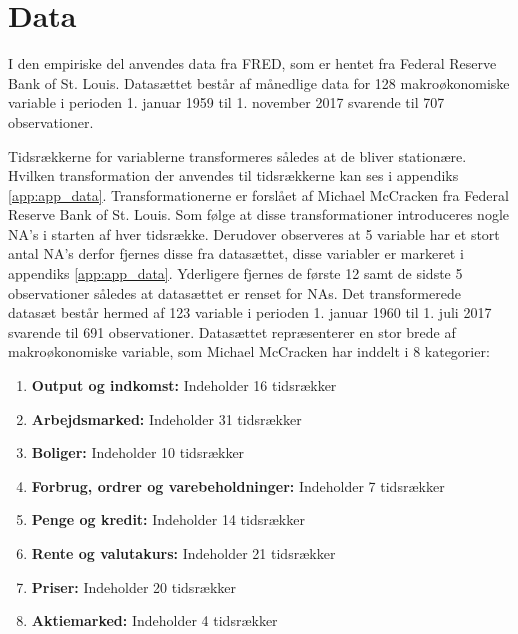 \chapter{Data}
I den empiriske del anvendes data fra FRED, som er hentet fra Federal Reserve Bank of St. Louis.
Datasættet består af månedlige data for 128 makroøkonomiske variable i perioden 1. januar 1959 til 1. november 2017 svarende til 707 observationer.

Tidsrækkerne for variablerne transformeres således at de bliver stationære.
Hvilken transformation der anvendes til tidsrækkerne kan ses i appendiks \ref{app:app_data}.
Transformationerne er forslået af Michael McCracken fra Federal Reserve Bank of St. Louis.  
Som følge at disse transformationer introduceres nogle NA's i starten af hver tidsrække.
Derudover observeres at 5 variable har et stort antal NA's derfor fjernes disse fra datasættet, disse variabler er markeret i appendiks \ref{app:app_data}.
Yderligere fjernes de første 12 samt de sidste 5 observationer således at datasættet er renset for NAs.
Det transformerede datasæt består hermed af 123 variable i perioden 1. januar 1960 til 1. juli 2017 svarende til 691 observationer.
%
Datasættet repræsenterer en stor brede af makroøkonomiske variable, som Michael McCracken har inddelt i 8 kategorier: 
\begin{enumerate}
\item \textbf{Output og indkomst:} Indeholder 16 tidsrækker
\item \textbf{Arbejdsmarked:}  Indeholder 31 tidsrækker
\item \textbf{Boliger:} Indeholder 10 tidsrækker
\item \textbf{Forbrug, ordrer og varebeholdninger:} Indeholder 7 tidsrækker
\item \textbf{Penge og kredit:} Indeholder 14 tidsrækker
\item\textbf{ Rente og valutakurs:} Indeholder 21 tidsrækker
\item \textbf{Priser:} Indeholder 20 tidsrækker
\item \textbf{Aktiemarked:} Indeholder 4 tidsrækker
\end{enumerate}
